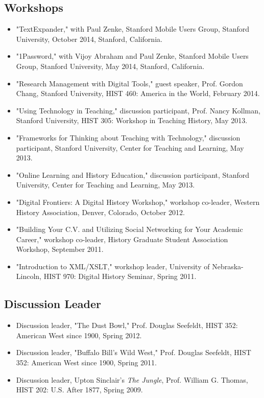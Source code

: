 \documentclass[10pt]{article}
\begin{document}
\subsection*{Workshops}

\begin{itemize}
  \item "TextExpander," with Paul Zenke, Stanford Mobile Users Group, Stanford University, October 2014, Stanford, California.
  \item "1Password," with Vijoy Abraham and Paul Zenke, Stanford Mobile Users Group, Stanford University, May 2014, Stanford, California.
  \item "Research Management with Digital Tools," guest speaker, Prof. Gordon Chang, Stanford University, HIST 460: America in the World, February 2014.
  \item "Using Technology in Teaching," discussion participant, Prof. Nancy Kollman, Stanford University, HIST 305: Workshop in Teaching History, May 2013.
  \item "Frameworks for Thinking about Teaching with Technology," discussion participant, Stanford University, Center for Teaching and Learning, May 2013.
  \item "Online Learning and History Education," discussion participant, Stanford University, Center for Teaching and Learning, May 2013.
  \item "Digital Frontiers: A Digital History Workshop," workshop co-leader, Western History Association, Denver, Colorado, October 2012.
  \item "Building Your C.V. and Utilizing Social Networking for Your Academic Career," workshop co-leader, History Graduate Student Association Workshop, September 2011.
  \item "Introduction to XML/XSLT," workshop leader, University of Nebraska-Lincoln, HIST 970: Digital History Seminar, Spring 2011.
\end{itemize}

\subsection*{Discussion Leader}

\begin{itemize}
  \item Discussion leader, "The Dust Bowl," Prof. Douglas Seefeldt, HIST 352: American West since 1900, Spring 2012.
  \item Discussion leader, "Buffalo Bill's Wild West," Prof. Douglas Seefeldt, HIST 352: American West since 1900, Spring 2011.
  \item Discussion leader, Upton Sinclair's \textit{The Jungle}, Prof. William G. Thomas, HIST 202: U.S. After 1877, Spring 2009.
\end{itemize}
\end{document}
